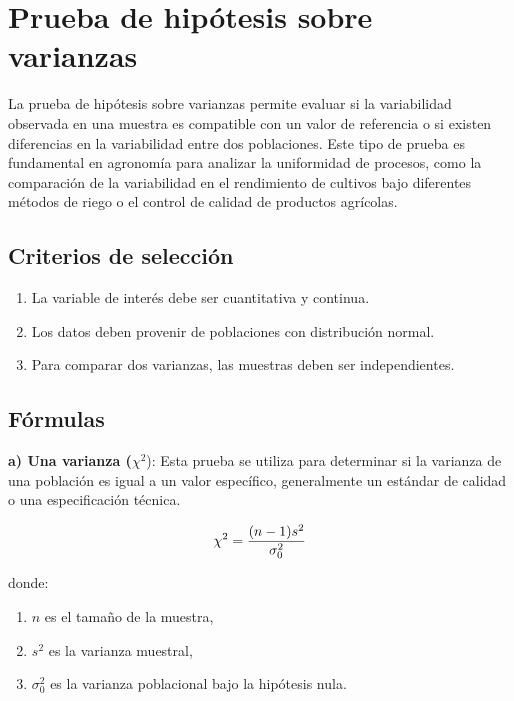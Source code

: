 \documentclass[
  spanish,
  letterpaper,
]{book}
\begin{document}
\section{Prueba de hipótesis sobre
varianzas}\label{prueba-de-hipuxf3tesis-sobre-varianzas}

La prueba de hipótesis sobre varianzas permite evaluar si la
variabilidad observada en una muestra es compatible con un valor de
referencia o si existen diferencias en la variabilidad entre dos
poblaciones. Este tipo de prueba es fundamental en agronomía para
analizar la uniformidad de procesos, como la comparación de la
variabilidad en el rendimiento de cultivos bajo diferentes métodos de
riego o el control de calidad de productos agrícolas.

\subsection{Criterios de selección}\label{criterios-de-selecciuxf3n-4}

\begin{enumerate}
\def\labelenumi{\arabic{enumi}.}
\item
  La variable de interés debe ser cuantitativa y continua.
\item
  Los datos deben provenir de poblaciones con distribución normal.
\item
  Para comparar dos varianzas, las muestras deben ser independientes.
\end{enumerate}

\subsection{Fórmulas}\label{fuxf3rmulas-3}

\textbf{a) Una varianza (}\(\chi^2\)): Esta prueba se utiliza para
determinar si la varianza de una población es igual a un valor
específico, generalmente un estándar de calidad o una especificación
técnica.

\[\huge \chi^2 = \frac{(n-1)s^2}{\sigma_0^2} \]\hspace{0pt}

donde:

\begin{enumerate}
\def\labelenumi{\arabic{enumi}.}
\item
  \(n\) es el tamaño de la muestra,
\item
  \(s^2\) es la varianza muestral,
\item
  \(\sigma_0^2\) es la varianza poblacional bajo la hipótesis nula.
\end{enumerate}
\end{document}
